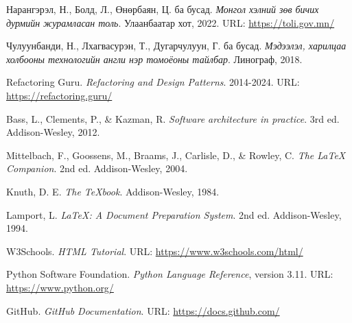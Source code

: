 

\singlespace
{}
\begin{thebibliography}{99}
    Нарангэрэл, Н., Болд, Л., Өнөрбаян, Ц. ба бусад. 
    \textit{Монгол хэлний зөв бичих дурмийн журамласан толь}. 
    Улаанбаатар хот, 2022. 
    URL: \url{https://toli.gov.mn/}
    
    Чулуунбанди, Н., Лхагвасурэн, Т., Дугарчулуун, Г. ба бусад. 
    \textit{Мэдээлэл, харилцаа холбооны технологийн англи нэр томоёоны тайлбар}. 
    Линограф, 2018.
    
    Refactoring Guru. 
    \textit{Refactoring and Design Patterns}. 
    2014-2024. 
    URL: \url{https://refactoring.guru/}
    
    Bass, L., Clements, P., \& Kazman, R. 
    \textit{Software architecture in practice}. 
    3rd ed. Addison-Wesley, 2012.
    
    Mittelbach, F., Goossens, M., Braams, J., Carlisle, D., \& Rowley, C. 
    \textit{The LaTeX Companion}. 
    2nd ed. Addison-Wesley, 2004.
    
    Knuth, D. E. 
    \textit{The TeXbook}. 
    Addison-Wesley, 1984.
    
    Lamport, L. 
    \textit{LaTeX: A Document Preparation System}. 
    2nd ed. Addison-Wesley, 1994.
    
    W3Schools. 
    \textit{HTML Tutorial}. 
    URL: \url{https://www.w3schools.com/html/}
    
    Python Software Foundation. 
    \textit{Python Language Reference}, version 3.11. 
    URL: \url{https://www.python.org/}
    
    GitHub. 
    \textit{GitHub Documentation}. 
    URL: \url{https://docs.github.com/}
    
\end{thebibliography}